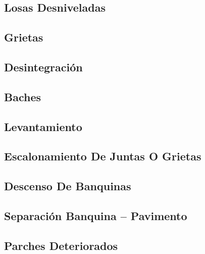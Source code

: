 \documentclass[letterpaper,10pt,spanish]{sphinxmanual}
\begin{document}
\subsection{Losas Desniveladas}
\label{patologia/rigidos:losas-desniveladas}

\subsection{Grietas}
\label{patologia/rigidos:grietas}

\subsection{Desintegración}
\label{patologia/rigidos:desintegracion}

\subsection{Baches}
\label{patologia/rigidos:baches}

\subsection{Levantamiento}
\label{patologia/rigidos:levantamiento}

\subsection{Escalonamiento De Juntas O Grietas}
\label{patologia/rigidos:escalonamiento-de-juntas-o-grietas}

\subsection{Descenso De Banquinas}
\label{patologia/rigidos:descenso-de-banquinas}

\subsection{Separación Banquina – Pavimento}
\label{patologia/rigidos:separacion-banquina-pavimento}

\subsection{Parches Deteriorados}
\label{patologia/rigidos:parches-deteriorados}\begin{quote}
\end{quote}
\end{document}
